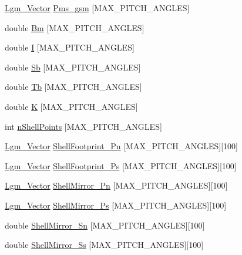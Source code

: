 \begin{CompactItemize}
\item 
\hyperlink{struct_lgm___vector}{Lgm\_\-Vector} \hyperlink{struct_lgm___mag_ephem_info_1d78a2b78227bd683d37e3b7eee614e9}{Pms\_\-gsm} \mbox{[}MAX\_\-PITCH\_\-ANGLES\mbox{]}
\item 
double \hyperlink{struct_lgm___mag_ephem_info_58b19efd51438b84ace93c628b985f64}{Bm} \mbox{[}MAX\_\-PITCH\_\-ANGLES\mbox{]}
\item 
double \hyperlink{struct_lgm___mag_ephem_info_f7c4c1569cb66f578b4bdef738b7e920}{I} \mbox{[}MAX\_\-PITCH\_\-ANGLES\mbox{]}
\item 
double \hyperlink{struct_lgm___mag_ephem_info_b7e342e135c0c1f98b60578a6accaa87}{Sb} \mbox{[}MAX\_\-PITCH\_\-ANGLES\mbox{]}
\item 
double \hyperlink{struct_lgm___mag_ephem_info_002672c07e6566f1824fb7d9f81228a2}{Tb} \mbox{[}MAX\_\-PITCH\_\-ANGLES\mbox{]}
\item 
double \hyperlink{struct_lgm___mag_ephem_info_2fc48ca4fe570dffe16ef8e235b572a2}{K} \mbox{[}MAX\_\-PITCH\_\-ANGLES\mbox{]}
\item 
int \hyperlink{struct_lgm___mag_ephem_info_7209f8815fcdddcb3100909e58729ae7}{nShellPoints} \mbox{[}MAX\_\-PITCH\_\-ANGLES\mbox{]}
\item 
\hyperlink{struct_lgm___vector}{Lgm\_\-Vector} \hyperlink{struct_lgm___mag_ephem_info_6476b5f20fa612531c2feca70655d947}{ShellFootprint\_\-Pn} \mbox{[}MAX\_\-PITCH\_\-ANGLES\mbox{]}\mbox{[}100\mbox{]}
\item 
\hyperlink{struct_lgm___vector}{Lgm\_\-Vector} \hyperlink{struct_lgm___mag_ephem_info_df864bbb783467664daaa3f072931827}{ShellFootprint\_\-Ps} \mbox{[}MAX\_\-PITCH\_\-ANGLES\mbox{]}\mbox{[}100\mbox{]}
\item 
\hyperlink{struct_lgm___vector}{Lgm\_\-Vector} \hyperlink{struct_lgm___mag_ephem_info_77f62c23ad73c46d65a58f3bd4df0007}{ShellMirror\_\-Pn} \mbox{[}MAX\_\-PITCH\_\-ANGLES\mbox{]}\mbox{[}100\mbox{]}
\item 
\hyperlink{struct_lgm___vector}{Lgm\_\-Vector} \hyperlink{struct_lgm___mag_ephem_info_f553d1e4efe198e474d5a38de0c6da91}{ShellMirror\_\-Ps} \mbox{[}MAX\_\-PITCH\_\-ANGLES\mbox{]}\mbox{[}100\mbox{]}
\item 
double \hyperlink{struct_lgm___mag_ephem_info_73c4025c84afef4f83812e9a70b69a72}{ShellMirror\_\-Sn} \mbox{[}MAX\_\-PITCH\_\-ANGLES\mbox{]}\mbox{[}100\mbox{]}
\item 
double \hyperlink{struct_lgm___mag_ephem_info_79d06251c694db0e26c64222f2078419}{ShellMirror\_\-Ss} \mbox{[}MAX\_\-PITCH\_\-ANGLES\mbox{]}\mbox{[}100\mbox{]}

\end{CompactItemize}
